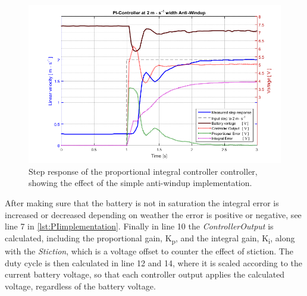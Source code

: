 %
\begin{figure}[H]
 	\centering
 	\includegraphics[width=.9\textwidth]{figures/PIwidthAntiWindup}
 	\caption{Step response of the proportional integral controller controller, showing the effect of the simple anti-windup implementation.}
 	\label{fig:PIwithAntiWindup}
\end{figure}\vspace{-5mm}
%
After making sure that the battery is not in saturation the integral error is increased or decreased depending on weather the error is positive or negative, see line 7 in \autoref{lst:PIimplementation}. Finally in line 10 the \emph{ControllerOutput} is calculated, including the proportional gain, \si{K_p}, and the integral gain, \si{K_i}, along with the \emph{Stiction}, which is a voltage offset to counter the effect of stiction.
The duty cycle is then calculated in line 12 and 14, where it is scaled according to the current battery voltage, so that each controller output applies the calculated voltage, regardless of the battery voltage.

